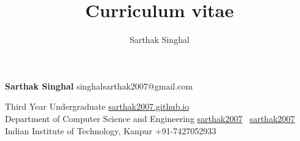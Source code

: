 \documentclass[9pt]{extarticle}
\title{Curriculum vitae}
\author{Sarthak Singhal}
\begin{document}

\begingroup
{}

{\fontsize{28pt}{1em}\textbf{\sc Sarthak Singhal}}
\hfill
{\Large {singhalsarthak2007@gmail.com}} \faEnvelope

{\Large Third Year Undergraduate}
\hfill
{\Large \href{https://sarthak2007.github.io}{sarthak2007.github.io\faHome}}\\

{\Large Department of Computer Science and Engineering}
\hfill
{\Large \href{https://github.com/sarthak2007}{sarthak2007\faGithub}} \textbar \ 
{\Large \href{https://www.linkedin.com/in/sarthak2007/}{sarthak2007 \faLinkedin}} \\

{\Large Indian Institute of Technology, Kanpur}
\hfill
{\Large +91-7427052933 \faMobile} \\
\vspace{2mm}
{\Large
}
\begin{minipage}[t]{0.49\textwidth}
  \vspace{1mm}
  
	\vspace{2mm}    
  
  \vspace{0mm}
  
\end{minipage}
\hfill
\begin{minipage}[t]{0.49\textwidth}
  \vspace{1mm}
  
\end{minipage}
\vspace{0mm}


\endgroup
\end{document}
